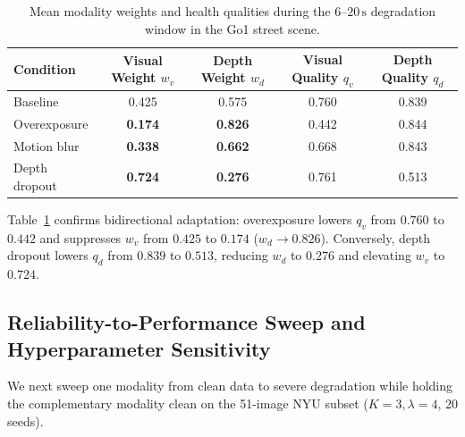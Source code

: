 \documentclass[11pt, a4paper]{article}
\begin{document}
\begin{table}[htbp]
    \centering
    \caption{Mean modality weights and health qualities during the $6$--$20\,\text{s}$ degradation window in the Go1 street scene.}
    \label{tab:weights}
    \footnotesize
    \begin{tabularx}{\textwidth}{>{\raggedright\arraybackslash}X cccc}
        \toprule
        \textbf{Condition} & Visual Weight $w_v$ & Depth Weight $w_d$ & Visual Quality $q_v$ & Depth Quality $q_d$ \\
        \midrule
        Baseline & 0.425 & 0.575 & 0.760 & 0.839 \\
        Overexposure & \textbf{0.174} & \textbf{0.826} & 0.442 & 0.844 \\
        Motion blur & \textbf{0.338} & \textbf{0.662} & 0.668 & 0.843 \\
        Depth dropout & \textbf{0.724} & \textbf{0.276} & 0.761 & 0.513 \\
        \bottomrule
    \end{tabularx}
\end{table}

Table~\ref{tab:weights} confirms bidirectional adaptation: overexposure lowers $q_v$ from $0.760$ to $0.442$ and suppresses $w_v$ from $0.425$ to $0.174$ ($w_d \to 0.826$). Conversely, depth dropout lowers $q_d$ from $0.839$ to $0.513$, reducing $w_d$ to $0.276$ and elevating $w_v$ to $0.724$.

\subsection{Reliability-to-Performance Sweep and Hyperparameter Sensitivity}
\label{subsec:reliability_sweep}
We next sweep one modality from clean data to severe degradation while holding the complementary modality clean on the 51-image NYU subset ($K=3, \lambda=4$, 20 seeds).
\end{document}
